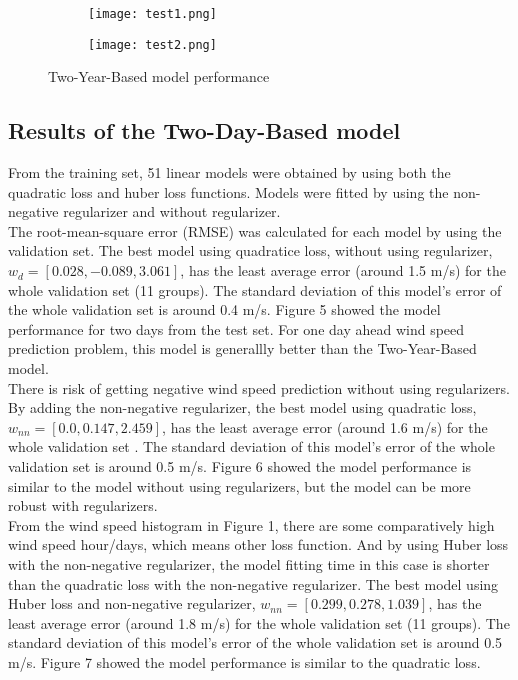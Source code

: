 \documentclass{article}
\begin{document}
\begin{figure}[h]
  \begin{subfigure}[b]{0.5\textwidth}
    \texttt{[image: test1.png]}
    \caption{} 
    \label{fig:f1}
  \end{subfigure}
  \hfill
  \begin{subfigure}[b]{0.5\textwidth}
    \texttt{[image: test2.png]}
    \caption{}
    \label{fig:f2}
  \end{subfigure}
  \caption{Two-Year-Based model performance}
\end{figure}

\subsection*{Results of the Two-Day-Based model}
From the training set, 51 linear models were obtained by using both the quadratic loss and huber loss functions.   Models were fitted by using the non-negative regularizer and without regularizer.\\
The root-mean-square error (RMSE) was calculated for each model by using the validation set.  The best model using quadratice loss, without using regularizer, $w_{d}=[0.028, -0.089, 3.061]$, has the least average error (around 1.5 m/s) for the whole validation set (11 groups).  The standard deviation of this model's error of the whole validation set is around 0.4 m/s.  Figure 5 showed the model performance for two days from the test set.  For one day ahead wind speed prediction problem, this model is generallly better than the Two-Year-Based model.\\
There is risk of getting negative wind speed prediction without using regularizers.  By adding the non-negative regularizer, the best model using quadratic loss, $w_{nn}=[0.0, 0.147, 2.459]$, has the least average error (around 1.6 m/s) for the whole validation set .  The standard deviation of this model's error of the whole validation set is around 0.5 m/s.   Figure 6 showed the model performance is similar to the model without using regularizers, but the model can be more robust with regularizers. \\
From the wind speed histogram in Figure 1, there are some comparatively high wind speed hour/days, which means other loss function.  And by using Huber loss with the non-negative regularizer, the model fitting time in this case is  shorter than the quadratic loss with the non-negative regularizer.  The best model using Huber loss and non-negative regularizer, $w_{nn}=[0.299, 0.278, 1.039]$, has the least average error (around  1.8  m/s) for the whole validation set (11 groups).  The standard deviation of this model's error of the whole validation set is around 0.5 m/s.   Figure 7 showed the model performance is similar to the quadratic loss. \\
\end{document}
